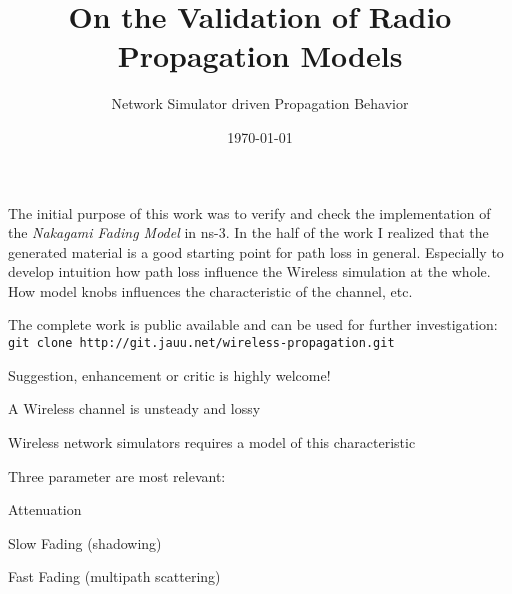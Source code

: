 \documentclass[9pt]{article}
\begin{document}
\title{On the Validation of Radio Propagation Models}

\subtitle{Network Simulator driven Propagation Behavior}

\date{\today}
\maketitle

\begin{slide}
\bi
	\item The initial purpose of this work was to verify and
	      check the implementation of the \textit{Nakagami Fading Model}
		  in ns-3. In the half of the work I realized that the generated
		  material is a good starting point for path loss in general.
		  Especially to develop intuition how path loss influence the Wireless
		  simulation at the whole. How model knobs influences the
		  characteristic of the channel, etc.

	\item The complete work is public available and can be used for further
	      investigation:\newline
	      \verb+git clone http://git.jauu.net/wireless-propagation.git+

	\item Suggestion, enhancement or critic is highly welcome!
\ei
\end{slide}

\begin{slide}
\bi
	\item A Wireless channel is unsteady and lossy

	\item Wireless network simulators requires a model of this characteristic

	\item Three parameter are most relevant:

	\be
		\item Attenuation
		\item Slow Fading (shadowing)
		\item Fast Fading (multipath scattering)
	\ee
\ei
\end{slide}
\end{document}
